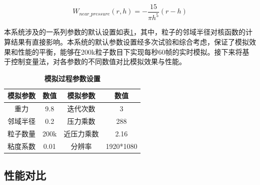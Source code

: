 \begin{equation}
    W_{near\_pressure}(r,h) = -\frac{15}{\pi h^5} (r-h)
    \label{con:nearPressure}
\end{equation}



本系统涉及的一系列参数的默认设置如表\ref{tab:simArgs}，其中，粒子的邻域半径对核函数的计算结果有直接影响。本系统的默认参数设置经多次试验和综合考虑，保证了模拟效果和性能的平衡，能够在200k粒子数目下实现每秒60帧的实时模拟。接下来将基于控制变量法，对各参数的不同数值对比模拟效果与性能。

\begin{table}[H]
    \caption{\textbf{模拟过程参数设置}}%
    \label{tab:simArgs}%
    \centering%
    \begin{tabular}{cccc}%
    \toprule%
    模拟参数&数值&模拟参数&数值 \\
    \midrule%
    重力&9.8&迭代次数&3 \\
    邻域半径&0.2&压力乘数&288 \\
    粒子数量&200k&近压力乘数&2.16 \\
    粘度系数&0.01&分辨率&1920*1080 \\
    \bottomrule%
\end{tabular}
\end{table}

\subsection{性能对比}


